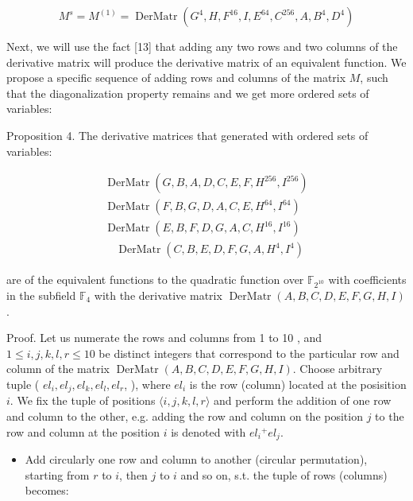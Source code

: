 \documentclass[10pt]{article}
\begin{document}
\begin{equation*}
M^{s}=M^{(1)}=\operatorname{DerMatr}\left(G^{4}, H, F^{16}, I, E^{64}, C^{256}, A, B^{4}, D^{4}\right) \tag{13}
\end{equation*}


Next, we will use the fact [13] that adding any two rows and two columns of the derivative matrix will produce the derivative matrix of an equivalent function. We propose a specific sequence of adding rows and columns of the matrix $M$, such that the diagonalization property remains and we get more ordered sets of variables:

Proposition 4. The derivative matrices that generated with ordered sets of variables:

\[
\begin{array}{r}
\operatorname{DerMatr}\left(G, B, A, D, C, E, F, H^{256}, I^{256}\right) \\
\operatorname{DerMatr}\left(F, B, G, D, A, C, E, H^{64}, I^{64}\right) \\
\operatorname{DerMatr}\left(E, B, F, D, G, A, C, H^{16}, I^{16}\right) \\
\quad \operatorname{DerMatr}\left(C, B, E, D, F, G, A, H^{4}, I^{4}\right) \tag{17}
\end{array}
\]

are of the equivalent functions to the quadratic function over $\mathbb{F}_{2^{10}}$ with coefficients in the subfield $\mathbb{F}_{4}$ with the derivative matrix $\operatorname{DerMatr}(A, B, C, D, E, F, G, H, I)$.

Proof. Let us numerate the rows and columns from 1 to 10 , and $1 \leq i, j, k, l, r \leq 10$ be distinct integers that correspond to the particular row and column of the matrix $\operatorname{DerMatr}(A, B, C, D, E, F, G, H, I)$. Choose arbitrary tuple ( $e l_{i}, e l_{j}, e l_{k}, e l_{l}, e l_{r}$, ), where $e l_{i}$ is the row (column) located at the posisition $i$. We fix the tuple of positions $\langle i, j, k, l, r\rangle$ and perform the addition of one row and column to the other, e.g. adding the row and column on the position $j$ to the row and column at the position $i$ is denoted with $e l_{i}{ }^{+} e l_{j}$.

\begin{itemize}
  \item Add circularly one row and column to another (circular permutation), starting from $r$ to $i$, then $j$ to $i$ and so on, s.t. the tuple of rows (columns) becomes:
\end{itemize}
\end{document}
